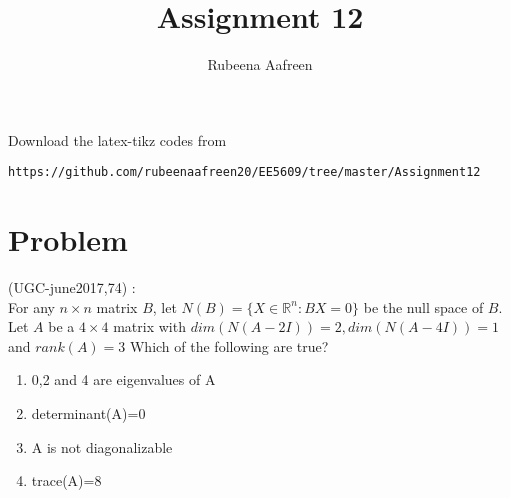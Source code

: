 \documentclass[journal,12pt]{IEEEtran}
\begin{document}
     \def\rightbox#1{\makebox[0in][r]{#1}}
     \def\centbox#1{\makebox[0in]{#1}}
     \def\topbox#1{\raisebox{-\baselineskip}[0in][0in]{#1}}
     \def\midbox#1{\raisebox{-0.5\baselineskip}[0in][0in]{#1}}
\vspace{3cm}
\title{Assignment 12}
\author{Rubeena Aafreen}
\maketitle
\bigskip
\renewcommand{\thefigure}{\theenumi}
\renewcommand{\thetable}{\theenumi}
%
Download the latex-tikz codes from 
%
\begin{lstlisting}
https://github.com/rubeenaafreen20/EE5609/tree/master/Assignment12
\end{lstlisting}
\section{\textbf{Problem}}
(UGC-june2017,74) : \\
%
For any $n\times n$ matrix $B$, let $N(B)=\{X\in \mathbb{R}^n:BX=0\}$ be the null space of $B$. Let $A$ be a $4\times 4$ matrix with $dim(N(A-2I))=2, dim(N(A-4I))=1$ and $rank(A)=3$
Which of the following are true?\\
\begin{enumerate}
\item 0,2 and 4 are eigenvalues of A
\item determinant(A)=0
\item A is not diagonalizable
\item trace(A)=8
\end{enumerate}
\end{document}
